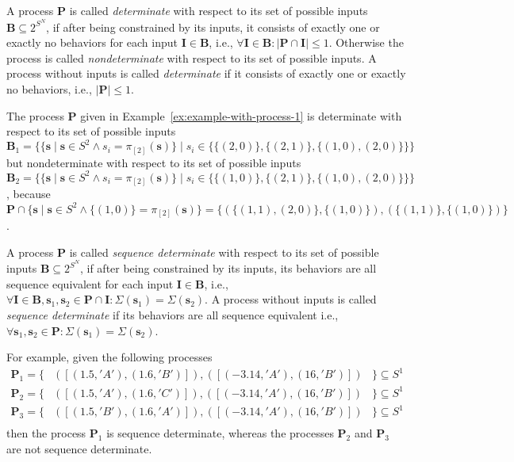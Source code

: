 A process $\mathbf{P}$ is called \emph{determinate} with respect
to its set of possible inputs $\mathbf{B} \subseteq 2^{S^N}$, if after being
constrained by its inputs, it consists of exactly one or exactly
no behaviors for each input $\mathbf{I} \in \mathbf{B}$,
i.e., $\forall{\mathbf{I} \in \mathbf{B}}: |\mathbf{P} \cap \mathbf{I}| \le 1$.
Otherwise the process is called \emph{nondeterminate} with respect
to its set of possible inputs. A process without inputs is called
\emph{determinate} if it consists of exactly one or exactly
no behaviors, i.e., $|\mathbf{P}| \le 1$.

\begin{example}
The process $\mathbf{P}$ given in Example~\ref{ex:example-with-process-1}
is determinate with respect to its set of possible inputs 
$\mathbf{B}_1 = \{ \{\mathbf{s} \mid \mathbf{s} \in S^2 \wedge s_i = \pi{}_{[2]}(\mathbf{s})\} \mid
                  s_i \in \{\{(2,0)\},\{(2,1)\},\{(1,0),(2,0)\}\} \}$
but nondeterminate with respect to its set of possible inputs 
$\mathbf{B}_2 = \{ \{\mathbf{s} \mid \mathbf{s} \in S^2 \wedge s_i = \pi{}_{[2]}(\mathbf{s})\} \mid
                  s_i \in \{\{(1,0)\},\{(2,1)\},\{(1,0),(2,0)\}\} \}$,
because $\mathbf{P} \cap \{\mathbf{s} \mid \mathbf{s} \in S^2 \wedge \{(1,0)\} = \pi{}_{[2]}(\mathbf{s})\} =
\{(\{(1,1),(2,0)\},\{(1,0)\}),(\{(1,1)\},\{(1,0)\})\}$.
\end{example}

A process $\mathbf{P}$ is called \emph{sequence determinate} with respect
to its set of possible inputs $\mathbf{B} \subseteq 2^{S^N}\!\!$, if after being
constrained by its inputs, its behaviors are all sequence equivalent
for each input $\mathbf{I} \in \mathbf{B}$,
i.e., $\forall{\mathbf{I} \in \mathbf{B}, \mathbf{s}_1, \mathbf{s}_2 \in \mathbf{P} \cap \mathbf{I}}: \Sigma(\mathbf{s}_1) = \Sigma(\mathbf{s}_2)$.
A process without inputs is called
\emph{sequence determinate} if its behaviors are all sequence equivalent
i.e., $\forall{\mathbf{s}_1, \mathbf{s}_2 \in \mathbf{P}}: \Sigma(\mathbf{s}_1) = \Sigma(\mathbf{s}_2)$.


\begin{example}
For example, given the following processes
\begin{displaymath}
\begin{array}{rll}
  \mathbf{P}_1 = \{ & ([(1.5,'A'),(1.6,'B')]),([(-3.14,'A'),(16,'B')]) & \} \subseteq S^1\\
  \mathbf{P}_2 = \{ & ([(1.5,'A'),(1.6,'C')]),([(-3.14,'A'),(16,'B')]) & \} \subseteq S^1\\
  \mathbf{P}_3 = \{ & ([(1.5,'B'),(1.6,'A')]),([(-3.14,'A'),(16,'B')]) & \} \subseteq S^1\\
\end{array}
\end{displaymath}
then the process $\mathbf{P}_1$ is sequence determinate, whereas the
processes $\mathbf{P}_2$ and $\mathbf{P}_3$ are not sequence determinate.
\end{example}

